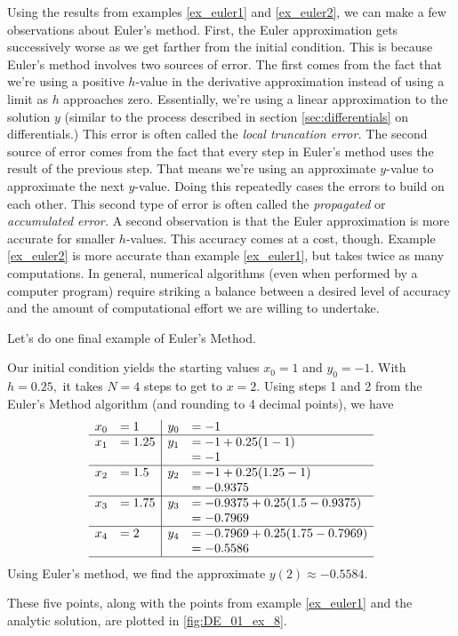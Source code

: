 
Using the results from examples \ref{ex_euler1} and \ref{ex_euler2}, we can make a few observations about Euler's method.  First, the Euler approximation gets successively worse as we get farther from the initial condition.  This is because Euler's method involves two sources of error.  The first comes from the fact that we're using a positive $h$-value in the derivative approximation instead of using a limit as $h$ approaches zero.  Essentially, we're using a linear approximation to the solution $y$ (similar to the process described in section \ref{sec:differentials} on differentials.) This error is often called the \emph{local truncation error.}  The second source of error comes from the fact that every step in Euler's method uses the result of the previous step.  That means we're using an approximate $y$-value to approximate the next $y$-value.  Doing this repeatedly cases the errors to build on each other.  This second type of error is often called the \emph{propagated} or \emph{accumulated error.} A second observation is that the Euler approximation is more accurate for smaller $h$-values.  This accuracy comes at a cost, though.  Example \ref{ex_euler2} is more accurate than example \ref{ex_euler1}, but takes twice as many computations.  In general, numerical algorithms (even when performed by a computer program) require striking a balance between a desired level of accuracy and the amount of computational effort we are willing to undertake.

Let's do one final example of Euler's Method.

{Our initial condition yields the starting values $x_0 = 1$ and $y_0 = -1$.  With $h = 0.25,$ it takes $N=4$ steps to get to $x=2.$  Using steps 1 and 2 from the Euler's Method algorithm (and rounding to 4 decimal points), we have
\[
\begin{array}{rl | rl}
x_0  &= 1			& 	y_0	&= -1\\ \hline
x_1 	&= 1.25		&	y_1 	&= -1 + 0.25(1 - 1)\\
	&			&		&= -1\\ \hline
x_2 	&= 1.5 		& 	y_2 	&= -1 + 0.25(1.25-1)\\
	&			&		&= -0.9375\\ \hline
x_3	&= 1.75		&	y_3 	&= -0.9375 + 0.25(1.5-0.9375)\\
	&			&		&= -0.7969\\ \hline
x_4	&= 2			&	y_4	&= -0.7969 + 0.25(1.75 - 0.7969)\\
	&			&		&= -0.5586\\ \hline
\end{array}
\]
Using Euler's method, we find the approximate $y(2) \approx -0.5584.$

These five points, along with the points from example \ref{ex_euler1} and the analytic solution, are plotted in \ref{fig:DE_01_ex_8}.
}\\
